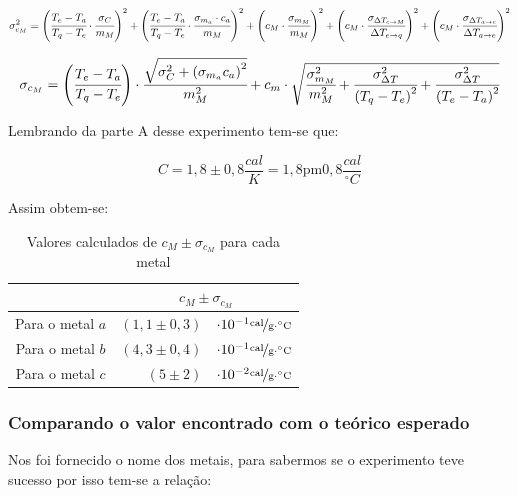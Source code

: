 \documentclass[a4paper]{article}
\providecommand{\tabularnewline}{\\}
\providecommand{\tabularnewline}{\\} %
\begin{document}
				\[
					\sigma_{c_{M}}^{2}=\left(\cfrac{T_{e}-T_{a}}{T_{q}-T_{e}}\cdot\cfrac{\sigma_{C}}{m_{M}}\right)^{2}+\left(\cfrac{T_{e}-T_{a}}{T_{q}-T_{e}}\cdot\cfrac{\sigma_{m_{a}}\cdot c_{a}}{m_{M}}\right)^{2}+\left(c_{M}\cdot\cfrac{\sigma_{m_{M}}}{m_{M}}\right)^{2}+\left(c_{M}\cdot\cfrac{\sigma_{\Delta T_{e\rightarrow M}}}{\Delta T_{e\rightarrow q}}\right)^{2}+\left(c_{M}\cdot\cfrac{\sigma_{\Delta T_{a\rightarrow e}}}{\Delta T_{a\rightarrow e}}\right)^{2}
				\]


				\begin{equation}
					\sigma_{c_{M}}=\left(\cfrac{T_{e}-T_{a}}{T_{q}-T_{e}}\right)\cdot\cfrac{\sqrt{\sigma_{C}^{2}+\left(\sigma_{m_{a}}c_{a}\right)^{2}}}{m_{M}^{2}}+c_{m}\cdot\sqrt{\cfrac{\sigma_{m_{M}}^{2}}{m_{M}^{2}}+\cfrac{\sigma_{\Delta T}^{2}}{\left(T_{q}-T_{e}\right)^{2}}+\cfrac{\sigma_{\Delta T}^{2}}{\left(T_{e}-T_{a}\right)^{2}}}
				\end{equation}


				Lembrando da parte A desse experimento tem-se que:

				\begin{equation}
					C=1,8\pm0,8\unit{\frac{cal}{K}=1,8\pm0,8}\frac{cal}{^{\circ}C}
				\end{equation}


				Assim obtem-se:

				\begin{table}[!ht]
					\caption{Valores calculados de $c_{M}\pm\sigma_{c_{M}}$ para cada metal}

					\centering{}%
					\begin{tabular}{|c|rl|}
						\cline{2-3} 
						\multicolumn{1}{c|}{} & \multicolumn{2}{c|}{$c_{M}\pm\sigma_{c_{M}}$}\tabularnewline
						\hline 
						Para o metal $a$ & $\left(1,1\pm0,3\right)$ & $\cdot10^{-1}\unitfrac{cal}{g\cdot^{\circ}C}$\tabularnewline
						\hline 
						Para o metal $b$ & $\left(4,3\pm0,4\right)$ & $\cdot10^{-1}\unitfrac{cal}{g\cdot^{\circ}C}$\tabularnewline
						\hline 
						Para o metal $c$ & $\left(5\pm2\right)$ & $\cdot10^{-2}\unitfrac{cal}{g\cdot^{\circ}C}$\tabularnewline
						\hline 
					\end{tabular}
				\end{table}

			\subsubsection{Comparando o valor encontrado com o teórico esperado}

				Nos foi fornecido o nome dos metais, para sabermos se o experimento
				teve sucesso por isso tem-se a relação:
\end{document}
